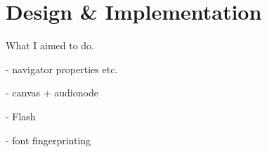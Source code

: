 \chapter{Design \& Implementation}

What I aimed to do.

- navigator properties etc.

- canvas + audionode

- Flash

- font fingerprinting

